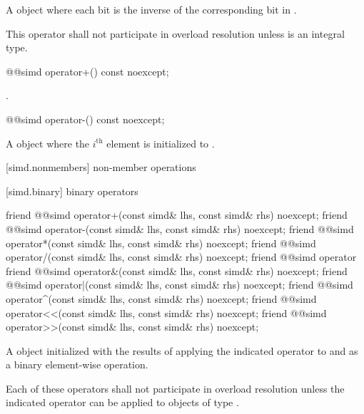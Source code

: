 \begin{itemdescr}
  \pnum\returns
  A  object where each bit is the inverse of the corresponding bit in .

  \pnum\remarks
  This operator shall not participate in overload resolution unless  is an integral type.
\end{itemdescr}

\begin{itemdecl}
@@simd operator+() const noexcept;
\end{itemdecl}

\begin{itemdescr}
  \pnum\returns
  .
\end{itemdescr}

\begin{itemdecl}
@@simd operator-() const noexcept;
\end{itemdecl}

\begin{itemdescr}
  \pnum\returns
  A  object where the $i^\text{th}$ element is initialized to  \foralli.
\end{itemdescr}

[simd.nonmembers]{ non-member operations}

[simd.binary]{ binary operators}

\begin{itemdecl}
friend @@simd operator+(const simd& lhs, const simd& rhs) noexcept;
friend @@simd operator-(const simd& lhs, const simd& rhs) noexcept;
friend @@simd operator*(const simd& lhs, const simd& rhs) noexcept;
friend @@simd operator/(const simd& lhs, const simd& rhs) noexcept;
friend @@simd operator%
friend @@simd operator&(const simd& lhs, const simd& rhs) noexcept;
friend @@simd operator|(const simd& lhs, const simd& rhs) noexcept;
friend @@simd operator^(const simd& lhs, const simd& rhs) noexcept;
friend @@simd operator<<(const simd& lhs, const simd& rhs) noexcept;
friend @@simd operator>>(const simd& lhs, const simd& rhs) noexcept;
\end{itemdecl}

\begin{itemdescr}
  \pnum\returns
  A  object initialized with the results of applying the indicated operator to  and  as a binary element-wise operation.

  \pnum\remarks
  Each of these operators shall not participate in overload resolution unless the indicated operator can be applied to objects of type .
\end{itemdescr}

